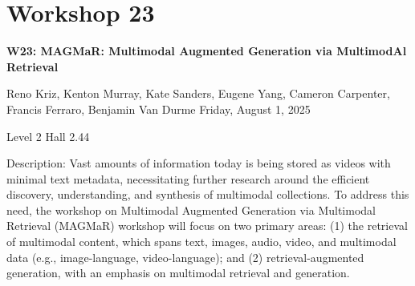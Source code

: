 \clearpage


\section[W23: MAGMaR: Multimodal Augmented Generation via MultimodAl Retrieval ]{Workshop 23}
\label{workshop_23}

\begin{center}
    {\Large \textbf{W23: MAGMaR: Multimodal Augmented Generation via MultimodAl Retrieval }}

Reno Kriz, Kenton Murray, Kate Sanders, Eugene Yang, Cameron Carpenter, Francis Ferraro, Benjamin Van Durme
    Friday, August 1, 2025

  Level 2 Hall 2.44
    
\end{center}

Description: Vast amounts of information today is being stored as videos with minimal text metadata, necessitating further research around the efficient discovery, understanding, and synthesis of multimodal collections. To address this need, the workshop on Multimodal Augmented Generation via Multimodal Retrieval (MAGMaR) workshop will focus on two primary areas: (1) the retrieval of multimodal content, which spans text, images, audio, video, and multimodal data (e.g., image-language, video-language); and (2) retrieval-augmented generation, with an emphasis on multimodal retrieval and generation.

